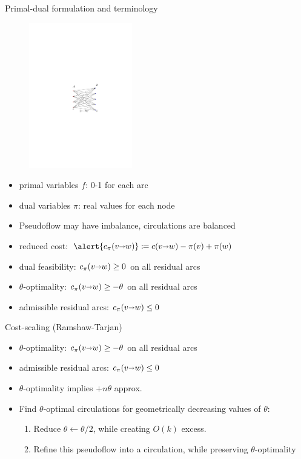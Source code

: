 \documentclass[xcolor={dvipsnames,usenames},handout]{beamer} %
\def\arcto{\mathord\shortrightarrow}
\def\arc#1#2{#1\arcto#2}
\begin{document}
\begin{frame}{Primal-dual formulation and terminology}
\begin{figure}
\begin{center}
\includegraphics[width=0.4\textwidth,page=8]{pm-to-mcf}%
\end{center}
\end{figure}
\begin{itemize}
\item \alert{primal} variables \alert{$f$}: 0-1 for each arc
\item \alert{dual} variables \alert{$\pi$}: real values for each node
\item \alert{Pseudoflow} may have imbalance, \alert{circulations} are balanced
\item \alert{reduced cost}: $\alert{c_\pi(\arc vw)} \coloneqq c(\arc vw) - \pi(v) + \pi(w)$
\vspace{5pt}
\item dual feasibility: $c_\pi(\arc vw) \geq 0$ on all residual arcs
\item \alert{$\theta$-optimality}: $c_\pi(\arc vw) \geq -\theta$ on all residual arcs
\vspace{5pt}
\item \alert{admissible} residual arcs: $c_\pi(\arc vw) \leq 0$ 
\end{itemize}
\end{frame}

\begin{frame}{Cost-scaling (Ramshaw-Tarjan)}
\begin{itemize}
\item \alert{$\theta$-optimality}: $c_\pi(\arc vw) \geq -\theta$ on all residual arcs
\item \alert{admissible} residual arcs: $c_\pi(\arc vw) \leq 0$ 
\vspace{15pt}
\item $\theta$-optimality implies $+n\theta$ approx.
\item Find $\theta$-optimal circulations for geometrically decreasing values of $\theta$:
	\begin{enumerate}
	\item Reduce $\theta \gets \theta/2$, while creating $O(k)$ excess.
	\item \alert{Refine} this pseudoflow into a circulation, while preserving $\theta$-optimality
	\end{enumerate}
\end{itemize}
\end{frame}
\end{document}

